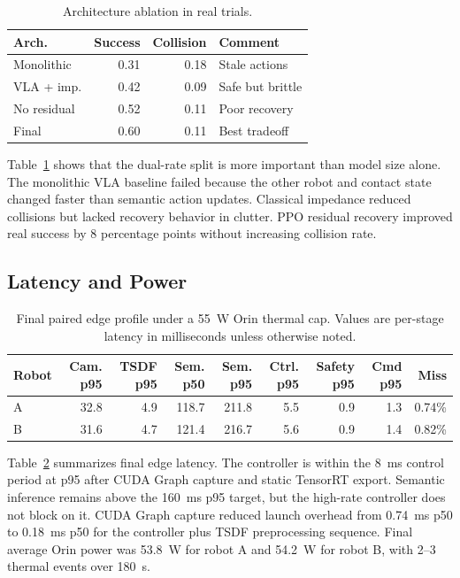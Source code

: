 \documentclass[10pt,twocolumn]{article}
\begin{document}
\begin{table}[t]
\centering
\caption{Architecture ablation in real trials.}
\label{tab:ablation}
\footnotesize
\begin{tabular}{@{}lrrl@{}}
\toprule
Arch. & Success & Collision & Comment \\
\midrule
Monolithic & 0.31 & 0.18 & Stale actions \\
VLA + imp. & 0.42 & 0.09 & Safe but brittle \\
No residual & 0.52 & 0.11 & Poor recovery \\
Final & 0.60 & 0.11 & Best tradeoff \\
\bottomrule
\end{tabular}
\end{table}

Table~\ref{tab:ablation} shows that the dual-rate split is more important than model size alone. The monolithic VLA baseline failed because the other robot and contact state changed faster than semantic action updates. Classical impedance reduced collisions but lacked recovery behavior in clutter. PPO residual recovery improved real success by 8 percentage points without increasing collision rate.

\subsection{Latency and Power}

\begin{table}[t]
\centering
\caption{Final paired edge profile under a \SI{55}{W} Orin thermal cap. Values are per-stage latency in milliseconds unless otherwise noted.}
\label{tab:latency}
\small
\begin{tabular}{@{}lrrrrrrrr@{}}
\toprule
Robot & Cam. p95 & TSDF p95 & Sem. p50 & Sem. p95 & Ctrl. p95 & Safety p95 & Cmd p95 & Miss \\
\midrule
A & 32.8 & 4.9 & 118.7 & 211.8 & 5.5 & 0.9 & 1.3 & 0.74\% \\
B & 31.6 & 4.7 & 121.4 & 216.7 & 5.6 & 0.9 & 1.4 & 0.82\% \\
\bottomrule
\end{tabular}
\end{table}

Table~\ref{tab:latency} summarizes final edge latency. The controller is within the \SI{8}{ms} control period at p95 after CUDA Graph capture and static TensorRT export. Semantic inference remains above the \SI{160}{ms} p95 target, but the high-rate controller does not block on it. CUDA Graph capture reduced launch overhead from \SI{0.74}{ms} p50 to \SI{0.18}{ms} p50 for the controller plus TSDF preprocessing sequence. Final average Orin power was \SI{53.8}{W} for robot A and \SI{54.2}{W} for robot B, with 2--3 thermal events over \SI{180}{s}.
\end{document}
